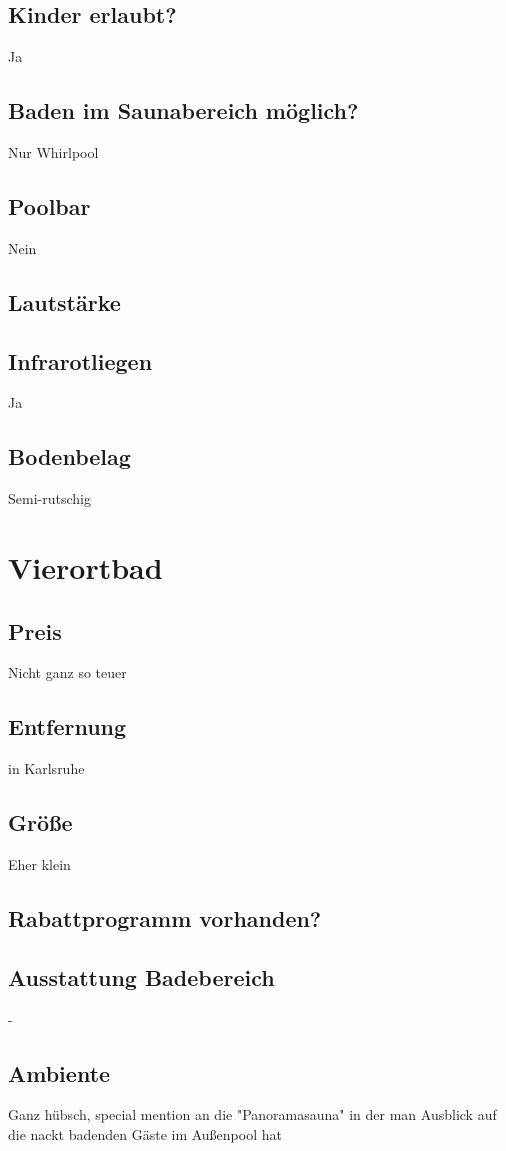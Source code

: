 \documentclass{article}
\begin{document}
\subsection*{Kinder erlaubt?} Ja
\subsection*{Baden im Saunabereich möglich?} Nur Whirlpool
\subsection*{Poolbar} Nein
\subsection*{Lautstärke}
\subsection*{Infrarotliegen} Ja
\subsection*{Bodenbelag} Semi-rutschig
\pagebreak

\section*{Vierortbad}
\subsection*{Preis} Nicht ganz so teuer
\subsection*{Entfernung} in Karlsruhe
\subsection*{Größe} Eher klein
\subsection*{Rabattprogramm vorhanden?}
\subsection*{Ausstattung Badebereich} -
\subsection*{Ambiente} Ganz hübsch, special mention an die "Panoramasauna" in der man Ausblick auf die nackt badenden Gäste im Außenpool hat
\end{document}

